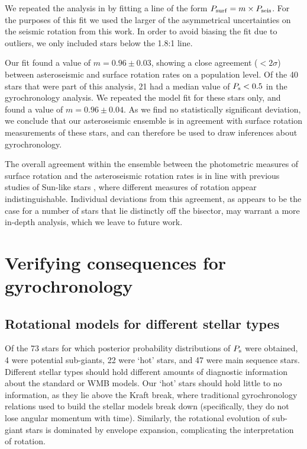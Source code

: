 \documentclass[12pt]{article}
\begin{document}
We repeated the analysis in \cite{nielsen+2015} by fitting a line of the form $P_{\rm surf} = m \times P_{\rm seis}$. For the purposes of this fit we used the larger of the asymmetrical uncertainties on the seismic rotation from this work. In order to avoid biasing the fit due to outliers, we only included stars below the 1.8:1 line.

Our fit found a value of $m = 0.96\pm0.03$, showing a close agreement ($< 2\sigma$) between asteroseismic and surface rotation rates on a population level. Of the 40 stars that were part of this analysis, 21 had a median value of $P_{\rm s} < 0.5$ in the gyrochronology analysis. We repeated the model fit for these stars only, and found a value of $m = 0.96 \pm 0.04$. As we find no statistically significant deviation, we conclude that our asteroseismic ensemble is in agreement with surface rotation measurements of these stars, and can therefore be used to draw inferences about gyrochronology.

The overall agreement within the ensemble between the photometric measures of surface rotation and the asteroseismic rotation rates is in line with previous studies of Sun-like stars \cite{gizon+2013, chaplin+2013, nielsen+2015, benomar+2015}, where different measures of rotation appear indistinguishable.
Individual deviations from this agreement, as appears to be the case for a number of stars that lie distinctly off the bisector, may warrant a more in-depth analysis, which we leave to future work.

\section{Verifying consequences for gyrochronology}
\subsection{Rotational models for different stellar types}
Of the 73 stars for which posterior probability distributions of $P_{\rm s}$ were obtained, 4 were potential sub-giants, 22 were `hot' stars, and 47 were main sequence stars. Different stellar types should hold different amounts of diagnostic information about the standard or WMB models. Our `hot' stars should hold little to no information, as they lie above the Kraft break, where traditional gyrochronology relations used to build the stellar models break down (specifically, they do not lose angular momentum with time). Similarly, the rotational evolution of sub-giant stars is dominated by envelope expansion, complicating the interpretation of rotation. 
\end{document}
